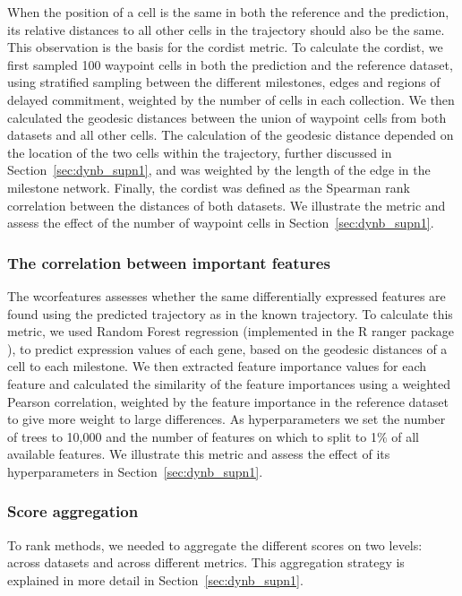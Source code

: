 When the position of a cell is the same in both the reference and the prediction, its relative distances to all other cells in the trajectory should also be the same. This observation is the basis for the cordist metric. To calculate the cordist, we first sampled 100 waypoint cells in both the prediction and the reference dataset, using stratified sampling between the different milestones, edges and regions of delayed commitment, weighted by the number of cells in each collection. We then calculated the geodesic distances between the union of waypoint cells from both datasets and all other cells. The calculation of the geodesic distance depended on the location of the two cells within the trajectory, further discussed in Section~\ref{sec:dynb_supn1}, and was weighted by the length of the edge in the milestone network. Finally, the cordist was defined as the Spearman rank correlation between the distances of both datasets. We illustrate the metric and assess the effect of the number of waypoint cells in Section~\ref{sec:dynb_supn1}.

\subsubsection{The correlation between important features}

The wcorfeatures assesses whether the same differentially expressed features are found using the predicted trajectory as in the known trajectory. To calculate this metric, we used Random Forest regression (implemented in the R ranger package \cite{wright_rangerfastimplementation_2017}), to predict expression values of each gene, based on the geodesic distances of a cell to each milestone. We then extracted feature importance values for each feature and calculated the similarity of the feature importances using a weighted Pearson correlation, weighted by the feature importance in the reference dataset to give more weight to large differences. As hyperparameters we set the number of trees to 10,000 and the number of features on which to split to 1$\%$ of all available features. We illustrate this metric and assess the effect of its hyperparameters in Section~\ref{sec:dynb_supn1}.

\subsubsection{Score aggregation}

To rank methods, we needed to aggregate the different scores on two levels: across datasets and across different metrics. This aggregation strategy is explained in more detail in Section~\ref{sec:dynb_supn1}.

